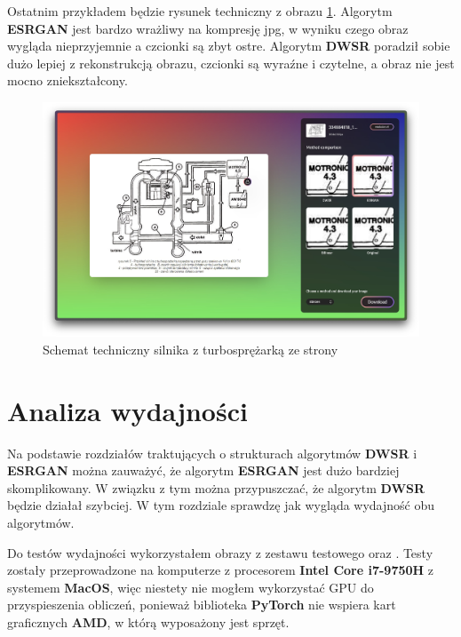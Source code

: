 Ostatnim przykładem będzie rysunek techniczny z obrazu \ref{fig:image105}. Algorytm \textbf{ESRGAN} jest bardzo wrażliwy na kompresję jpg, w wyniku czego obraz wygląda nieprzyjemnie a czcionki są zbyt ostre.  Algorytm \textbf{DWSR} poradził sobie dużo lepiej z rekonstrukcją obrazu, czcionki są wyraźne i czytelne, a obraz nie jest mocno zniekształcony.

\begin{figure}[H]
    \centering
    \includegraphics[width=0.85\linewidth]{Rozdziały/05.Porownanie_algorytmow/Obrazy/Zrzut ekranu 2023-12-12 o 14.20.22.jpg}  
    \caption{Schemat techniczny silnika z turbosprężarką ze strony \cite{zssplus} }
    \label{fig:image105}
\end{figure}

\section{Analiza wydajności}

Na podstawie rozdziałów traktujących o strukturach algorytmów \textbf{DWSR} i \textbf{ESRGAN} można zauważyć, że algorytm \textbf{ESRGAN} jest dużo bardziej skomplikowany. W związku z tym można przypuszczać, że algorytm \textbf{DWSR} będzie działał szybciej. W tym rozdziale sprawdzę jak wygląda wydajność obu algorytmów.

Do testów wydajności wykorzystałem obrazy z zestawu testowego \cite{guo2017deep} oraz \cite{zeyde2010single}. Testy zostały przeprowadzone na komputerze z procesorem \textbf{Intel Core i7-9750H} z systemem \textbf{MacOS}, więc niestety nie mogłem wykorzystać GPU do przyspieszenia obliczeń, ponieważ biblioteka \textbf{PyTorch} nie wspiera kart graficznych \textbf{AMD}, w którą wyposażony jest sprzęt.

